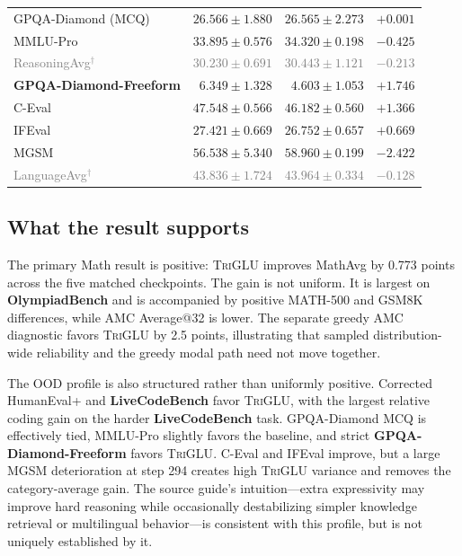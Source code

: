 \documentclass[10pt]{article}
\newcommand{\TriGLU}{\textsc{TriGLU}}
\begin{document}
\begin{table}[H]
\begin{tabular}{lrrr}
\midrule
GPQA-Diamond (MCQ) & $26.566\pm1.880$ & $26.565\pm2.273$ & $+0.001$ \\
MMLU-Pro & $33.895\pm0.576$ & $34.320\pm0.198$ & $-0.425$ \\
\textcolor{gray}{ReasoningAvg$^\dagger$} & \textcolor{gray}{$30.230\pm0.691$} & \textcolor{gray}{$30.443\pm1.121$} & \textcolor{gray}{$-0.213$} \\
\textbf{GPQA-Diamond-Freeform} & $\mathbf{6.349\pm1.328}$ & $\mathbf{4.603\pm1.053}$ & $\mathbf{+1.746}$ \\
\midrule
C-Eval & $47.548\pm0.566$ & $46.182\pm0.560$ & $+1.366$ \\
IFEval & $27.421\pm0.669$ & $26.752\pm0.657$ & $+0.669$ \\
MGSM & $56.538\pm5.340$ & $58.960\pm0.199$ & $-2.422$ \\
\textcolor{gray}{LanguageAvg$^\dagger$} & \textcolor{gray}{$43.836\pm1.724$} & \textcolor{gray}{$43.964\pm0.334$} & \textcolor{gray}{$-0.128$} \\
\bottomrule
\end{tabular}
\end{table}

\subsection{What the result supports}

The primary Math result is positive: \TriGLU{} improves MathAvg by 0.773
points across the five matched checkpoints.  The gain is not uniform.  It is
largest on \textbf{OlympiadBench} and is accompanied by positive MATH-500 and GSM8K
differences, while AMC Average@32 is lower.  The separate greedy AMC diagnostic
favors \TriGLU{} by 2.5 points, illustrating that sampled distribution-wide
reliability and the greedy modal path need not move together.

The OOD profile is also structured rather than uniformly positive.  Corrected
HumanEval+ and \textbf{LiveCodeBench} favor \TriGLU{}, with the largest relative coding
gain on the harder \textbf{LiveCodeBench} task.  GPQA-Diamond MCQ is effectively tied,
MMLU-Pro slightly favors the baseline, and strict
\textbf{GPQA-Diamond-Freeform} favors
\TriGLU{}.  C-Eval and IFEval improve, but a large MGSM deterioration at
step 294 creates high \TriGLU{} variance and removes the category-average gain.
The source guide's intuition---extra expressivity may improve hard reasoning
while occasionally destabilizing simpler knowledge retrieval or multilingual
behavior---is consistent with this profile, but is not uniquely established by
it.
\end{document}
